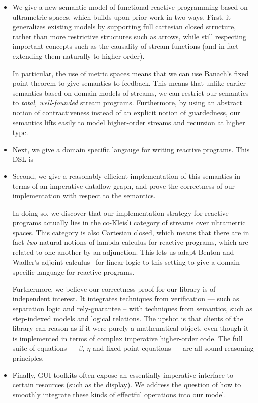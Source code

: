 \documentclass[preprint]{sigplanconf}
\begin{document}
\begin{itemize}
\item We give a new semantic model of functional reactive programming
  based on ultrametric spaces, which builds upon prior work in two
  ways. First, it generalizes existing models by supporting full
  cartesian closed structure, rather than more restrictive structures
  such as arrows, while still respecting important concepts such as
  the causality of stream functions (and in fact extending them
  naturally to higher-order). 

  In particular, the use of metric spaces means that we can use
  Banach's fixed point theorem to give semantics to feedback. This
  means that unlike earlier semantics based on domain models of
  streams, we can restrict our semantics to \emph{total, well-founded}
  stream programs. Furthermore, by using an abstract notion of
  contractiveness instead of an explicit notion of guardedness, our
  semantics lifts easily to model higher-order streams and recursion
  at higher type.

\item Next, we give a domain specific langauge for writing reactive
  programs. This DSL is 

\item Second, we give a reasonably efficient implementation of this
  semantics in terms of an imperative dataflow graph, and prove the
  correctness of our implementation with respect to the semantics.  

  In doing so, we discover that our implementation strategy for
  reactive programs actually lies in the co-Kleisli category of
  streams over ultrametric spaces. This category is also Cartesian
  closed, which means that there are in fact \emph{two} natural
  notions of lambda calculus for reactive programs, which are related
  to one another by an adjunction. This lets us adapt Benton and
  Wadler's adjoint calculus~\cite{benton-wadler} for linear logic to
  this setting to give a domain-specific language for reactive
  programs.

  Furthermore, we believe our correctness proof for our library is of
  independent interest. It integrates techniques from verification ---
  such as separation logic and rely-guarantee -- with techniques from
  semantics, such as step-indexed models and logical relations. The
  upshot is that clients of the library can reason as if it were
  purely a mathematical object, even though it is implemented in terms
  of complex imperative higher-order code. The full suite of equations
  --- $\beta$, $\eta$ and fixed-point equations --- are all sound
  reasoning principles.

\item Finally, GUI toolkits often expose an essentially imperative
  interface to certain resources (such as the display). We address the
  question of how to smoothly integrate these kinds of effectful
  operations into our model. 
\end{itemize}
\end{document}
